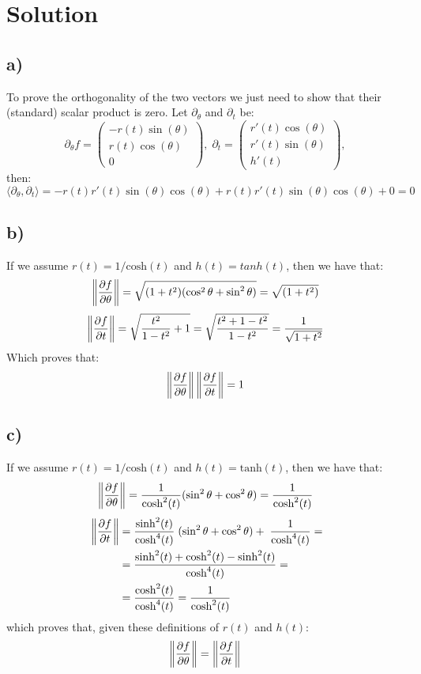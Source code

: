 \documentclass{article}[a4paper]
\begin{document}
\section{Solution} %
    \subsection*{a)}
        To prove the orthogonality of the two vectors we just need to show that their (standard) scalar product is zero. Let $\partial_\theta$ and $\partial_t$ be:
        \[
            \partial_\theta f =
            \begin{pmatrix}
                -r(t) \sin(\theta)\\
                r(t) \cos(\theta)\\
                0
            \end{pmatrix}, \;
            \partial_t = \begin{pmatrix}
                r'(t) \cos(\theta)\\
                r'(t) \sin(\theta)\\
                h'(t)
            \end{pmatrix},
        \]
        then:
        \[
            \langle \partial_\theta , \partial_t \rangle = - r(t)r'(t) \sin(\theta) \cos(\theta) + r(t)r'(t) \sin(\theta) \cos(\theta) + 0 = 0
        \]
    \subsection*{b)}
        If we assume $r(t) = 1/\mbox{cosh}(t)$ and $h(t) = tanh(t)$, then we have that:
        \[
            \left\| \pdv{f}{\theta} \right\| = \sqrt{(1+t^2)(\cos^2{\theta} + \sin^2{\theta})} = \sqrt{(1+t^2)}
        \]
        \[
            \left\| \pdv{f}{t} \right\| = \sqrt{\frac{t^2}{1-t^2} + 1} = \sqrt{\frac{t^2+1-t^2}{1-t^2}} = \frac{1}{\sqrt{1+t^2}}
        \]
        Which proves that:
        \[
            \left\| \pdv{f}{\theta} \right\|  \left\| \pdv{f}{t} \right\| = 1
        \]
    \subsection*{c)}
        If we assume $r(t) = 1/\mbox{cosh}(t)$ and $h(t) = \mbox{tanh}(t)$, then we have that:
            \[
                \left\| \pdv{f}{\theta} \right\| = \frac{1}{\mbox{cosh}^2(t)} (\sin^2{\theta} + \cos^2{\theta}) = \frac{1}{\mbox{cosh}^2(t)}
            \]
            \[\
                \begin{split}
                    \left\| \pdv{f}{t} \right\| &=  \frac{\mbox{sinh}^2(t)}{\mbox{cosh}^4(t)}\; (\sin^2{\theta} + \cos^2{\theta}) + \; \frac{1}{\mbox{cosh}^4(t)} =\\
                    &= \frac{\mbox{sinh}^2(t) + \mbox{cosh}^2(t) - \mbox{sinh}^2(t)}{\mbox{cosh}^4(t)} =\\
                    &=\frac{\mbox{cosh}^2(t)}{\mbox{cosh}^4(t)} =\frac{1}{\mbox{cosh}^2(t)}
                \end{split}
            \]
            which proves that, given these definitions of $r(t)$ and $h(t)$:
            \[
                \left\| \pdv{f}{\theta} \right\| = \left\| \pdv{f}{t} \right\|
            \]
\end{document}
